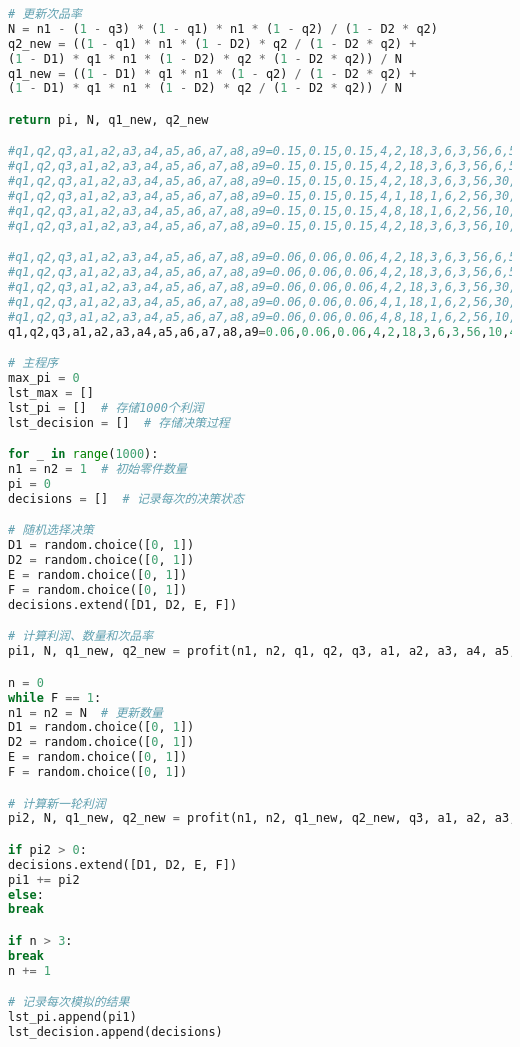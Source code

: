 \documentclass[withoutpreface,bwprint]{cumcmthesis} %
\begin{document}
\begin{lstlisting}[language=python]
# 更新次品率
N = n1 - (1 - q3) * (1 - q1) * n1 * (1 - q2) / (1 - D2 * q2)
q2_new = ((1 - q1) * n1 * (1 - D2) * q2 / (1 - D2 * q2) +
(1 - D1) * q1 * n1 * (1 - D2) * q2 * (1 - D2 * q2)) / N
q1_new = ((1 - D1) * q1 * n1 * (1 - q2) / (1 - D2 * q2) +
(1 - D1) * q1 * n1 * (1 - D2) * q2 / (1 - D2 * q2)) / N

return pi, N, q1_new, q2_new

#q1,q2,q3,a1,a2,a3,a4,a5,a6,a7,a8,a9=0.15,0.15,0.15,4,2,18,3,6,3,56,6,5
#q1,q2,q3,a1,a2,a3,a4,a5,a6,a7,a8,a9=0.15,0.15,0.15,4,2,18,3,6,3,56,6,5
#q1,q2,q3,a1,a2,a3,a4,a5,a6,a7,a8,a9=0.15,0.15,0.15,4,2,18,3,6,3,56,30,5
#q1,q2,q3,a1,a2,a3,a4,a5,a6,a7,a8,a9=0.15,0.15,0.15,4,1,18,1,6,2,56,30,5
#q1,q2,q3,a1,a2,a3,a4,a5,a6,a7,a8,a9=0.15,0.15,0.15,4,8,18,1,6,2,56,10,5
#q1,q2,q3,a1,a2,a3,a4,a5,a6,a7,a8,a9=0.15,0.15,0.15,4,2,18,3,6,3,56,10,40

#q1,q2,q3,a1,a2,a3,a4,a5,a6,a7,a8,a9=0.06,0.06,0.06,4,2,18,3,6,3,56,6,5
#q1,q2,q3,a1,a2,a3,a4,a5,a6,a7,a8,a9=0.06,0.06,0.06,4,2,18,3,6,3,56,6,5
#q1,q2,q3,a1,a2,a3,a4,a5,a6,a7,a8,a9=0.06,0.06,0.06,4,2,18,3,6,3,56,30,5
#q1,q2,q3,a1,a2,a3,a4,a5,a6,a7,a8,a9=0.06,0.06,0.06,4,1,18,1,6,2,56,30,5
#q1,q2,q3,a1,a2,a3,a4,a5,a6,a7,a8,a9=0.06,0.06,0.06,4,8,18,1,6,2,56,10,5
q1,q2,q3,a1,a2,a3,a4,a5,a6,a7,a8,a9=0.06,0.06,0.06,4,2,18,3,6,3,56,10,40

# 主程序
max_pi = 0
lst_max = []
lst_pi = []  # 存储1000个利润
lst_decision = []  # 存储决策过程

for _ in range(1000):
n1 = n2 = 1  # 初始零件数量
pi = 0
decisions = []  # 记录每次的决策状态

# 随机选择决策
D1 = random.choice([0, 1])
D2 = random.choice([0, 1])
E = random.choice([0, 1])
F = random.choice([0, 1])
decisions.extend([D1, D2, E, F])

# 计算利润、数量和次品率
pi1, N, q1_new, q2_new = profit(n1, n2, q1, q2, q3, a1, a2, a3, a4, a5, a6, a7, a8, a9, D1, D2, E, F)

n = 0
while F == 1:
n1 = n2 = N  # 更新数量
D1 = random.choice([0, 1])
D2 = random.choice([0, 1])
E = random.choice([0, 1])
F = random.choice([0, 1])

# 计算新一轮利润
pi2, N, q1_new, q2_new = profit(n1, n2, q1_new, q2_new, q3, a1, a2, a3, a4, a5, a6, a7, a8, a9, D1, D2, E, F)

if pi2 > 0:
decisions.extend([D1, D2, E, F])
pi1 += pi2
else:
break

if n > 3:
break
n += 1

# 记录每次模拟的结果
lst_pi.append(pi1)
lst_decision.append(decisions)


\end{lstlisting}
\end{document}
